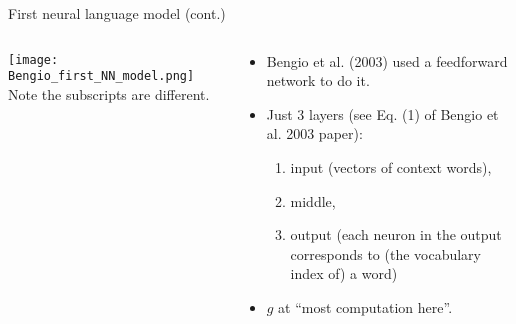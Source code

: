 \documentclass[10pt]{beamer}
\begin{document}
\begin{frame}{First neural language model (cont.)}
\begin{columns}
   \begin{column}{.6\textwidth}
      \texttt{[image: Bengio\_first\_NN\_model.png]}  
 {     \tiny    Note the subscripts are different.  }
   \end{column}
   \begin{column}{.6\textwidth}
      \begin{itemize}
       \item Bengio et al. (2003) used a feedforward network to do it.
       \item Just 3 layers (see Eq. (1) of Bengio et al. 2003 paper): 
       \begin{enumerate}
        \item input (vectors of context words), 
        \item middle, 
        \item output (each neuron in the output corresponds to (the vocabulary index of) a word)
       \end{enumerate}
       \item $g$ at ``most computation here''.
      \end{itemize}
   \end{column}
\end{columns}
\end{frame}

\end{document}
